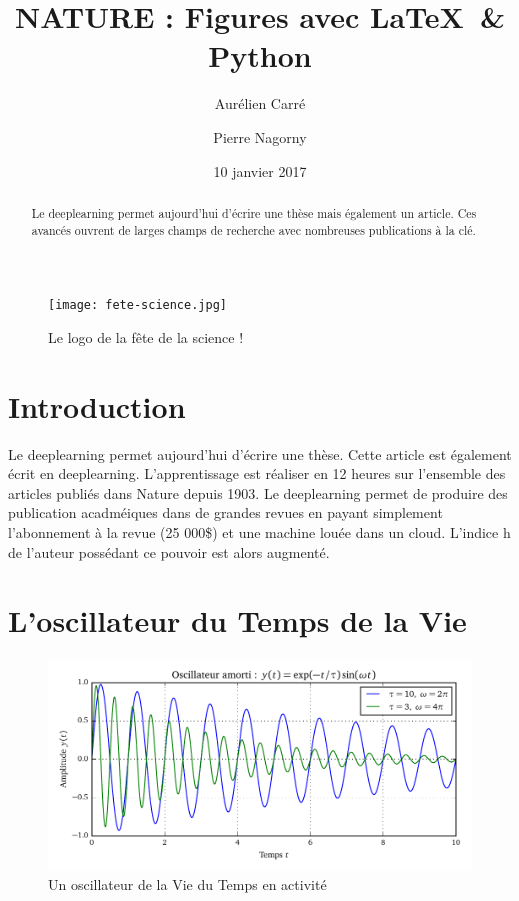 \documentclass[10pt,a4paper]{article}
\title{NATURE : Figures avec \LaTeX \ \& Python}
\author[1]{Aurélien Carré}
\author[1]{Pierre Nagorny}
\affil[1]{Laboratoire pour le Prix Nobel de la Mécatronique 2017}
\date{10 janvier 2017}
\begin{document}
\maketitle

\begin{figure}[h]
\begin{center}
\texttt{[image: fete-science.jpg]}
\caption{Le logo de la fête de la science !}
\end{center}
\end{figure}

\begin{abstract}
    Le deeplearning permet aujourd'hui d'écrire une thèse mais également un article. Ces avancés ouvrent de larges champs de recherche avec nombreuses publications à la clé.
\end{abstract}

\section{Introduction}
Le deeplearning permet aujourd'hui d'écrire une thèse. Cette article est également écrit en deeplearning.
L'apprentissage est réaliser en 12 heures sur l'ensemble des articles publiés dans Nature depuis 1903.
Le deeplearning permet de produire des publication acadméiques dans de grandes revues en payant simplement l'abonnement à la revue (25 000\$) et une machine louée dans un cloud. L'indice h de l'auteur possédant ce pouvoir est alors augmenté.



\section{L'oscillateur du Temps de la Vie}
\begin{figure}[h]
\begin{center}
\includegraphics{Oscillateur}
\end{center}
\caption{Un oscillateur de la Vie du Temps en activité}
\end{figure}
\end{document}
